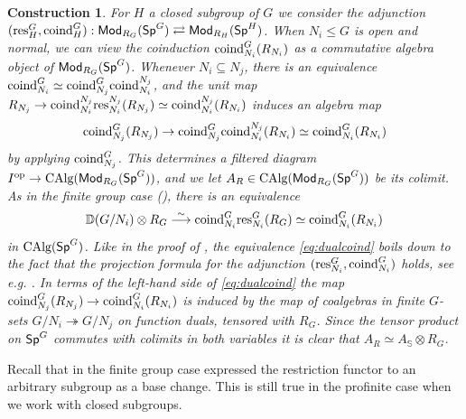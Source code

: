 \documentclass[reqno]{amsart}
\numberwithin{equation}{section}\theoremstyle{thms}
\theoremstyle{defn}
\newtheorem{cons}[equation]{Construction}
\newcommand{\bD}{\mathbb{D}}
\newcommand{\bS}{\mathbb{S}}
\newcommand{\tn}[1]{\textnormal{#1}}
\newcommand{\tsf}[1]{\textsf{\textup{#1}}}
\newcommand{\op}{\tn{op}}
\newcommand{\calg}{\tn{CAlg}}
\newcommand{\Mod}{\tsf{Mod}}
\newcommand{\spec}{\tsf{Sp}}
\newcommand{\specg}{\tsf{Sp}^G}
\begin{document}
\begin{cons}\label{cons:colimitoforbits}
For $H$ a closed subgroup of $G$ we consider the adjunction $(\tn{res}^G_H, \tn{coind}^G_H): \Mod_{R_G}(\specg) \rightleftarrows \Mod_{R_H}(\spec^H)$. When $N_i \leq G$ is open and normal, we can view the coinduction $\tn{coind}^G_{N_i}(R_{N_i})$ as a commutative algebra object of $\Mod_{R_G}(\specg)$. Whenever $N_i \subseteq N_j$, there is an equivalence $\tn{coind}^G_{N_i} \simeq \tn{coind}^G_{N_j}\tn{coind}^{N_j}_{N_i}$, and the unit map $R_{N_j} \to \tn{coind}^{N_j}_{N_i}\tn{res}^{N_j}_{N_i}(R_{N_j}) \simeq \tn{coind}^{N_j}_{N_i}(R_{N_i})$ induces an algebra map
$$\tn{coind}^G_{N_j}(R_{N_j}) \to \tn{coind}^G_{N_j}\tn{coind}^{N_j}_{N_i}(R_{N_i}) \simeq \tn{coind}^G_{N_i}(R_{N_i})$$
by applying $\tn{coind}^G_{N_j}$. This determines a filtered diagram $I^\op \to \calg(\Mod_{R_G}(\specg))$, and we let $A_R \in \calg(\Mod_{R_G}(\specg))$ be its colimit. As in the finite group case (), there is an equivalence
\begin{equation}\label{eq:dualcoind}
\bD(G/N_i) \otimes R_G \stackrel{\sim}{\longrightarrow} \tn{coind}^G_{N_i}\tn{res}^G_{N_i}(R_G) \simeq \tn{coind}^G_{N_i}(R_{N_i})
\end{equation}
in $\calg(\specg)$. Like in the proof of \cite[Lemma 3.8]{bchnl25}, the equivalence \ref{eq:dualcoind} boils down to the fact that the projection formula for the adjunction $(\tn{res}^G_{N_i}, \tn{coind}^G_{N_i})$ holds, see e.g. \cite[Theorem 1.3]{bds16}. In terms of the left-hand side of \ref{eq:dualcoind} the map $\tn{coind}^G_{N_j}(R_{N_j}) \to \tn{coind}^G_{N_i}(R_{N_i})$ is induced by the map of coalgebras in finite $G$-sets $G/N_i \twoheadrightarrow G/N_j$ on function duals, tensored with $R_G$. Since the tensor product on $\specg$ commutes with colimits in both variables it is clear that $A_R \simeq A_{\bS} \otimes R_G$.
\end{cons}

Recall that in the finite group case  expressed the restriction functor to an arbitrary subgroup as a base change. This is still true in the profinite case when we work with closed subgroups. 
\end{document}
